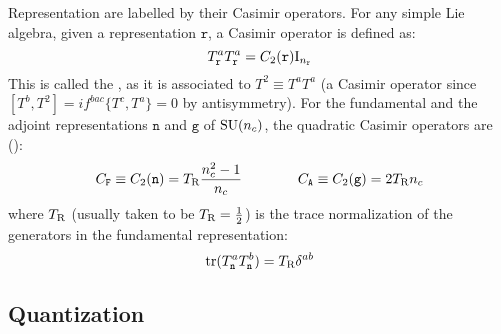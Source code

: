 Representation are labelled by their Casimir operators. For any simple Lie algebra, given a representation $ \mathtt{r} $, a Casimir operator is defined as:
\begin{equation}
  T^a_\mathtt{r} T^a_\mathtt{r} = C_2(\mathtt{r}) \mathrm{I}_{n_{\mathtt{r}}}
  \label{eq:quad-cas}
\end{equation}
This is called the , as it is associated to $ T^2 \equiv T^a T^a $ (a Casimir operator since $ [T^b, T^2] = i f^{bac} \{T^c,T^a\} = 0 $ by antisymmetry). For the fundamental and the adjoint representations $ \mathtt{n} $ and $ \mathtt{g} $ of $ \mathrm{SU}(n_c) $, the quadratic Casimir operators are ():
\begin{equation}
  C_\mathtt{F} \equiv C_2(\mathtt{n}) = T_\text{R} \frac{n_c^2 - 1}{n_c}
  \qquad \qquad
  C_\mathtt{A} \equiv C_2(\mathtt{g}) = 2T_\text{R} n_c
  \label{eq:cas-sun}
\end{equation}
where $ T_\text{R} $ (usually taken to be $ T_\text{R} = \frac{1}{2} $) is the trace normalization of the generators in the fundamental representation:
\begin{equation}
  \operatorname{tr} (T^a_\mathtt{n} T^b_\mathtt{n}) = T_\text{R} \delta^{ab}
  \label{eq:diag-norm}
\end{equation}

\subsection{Quantization}

